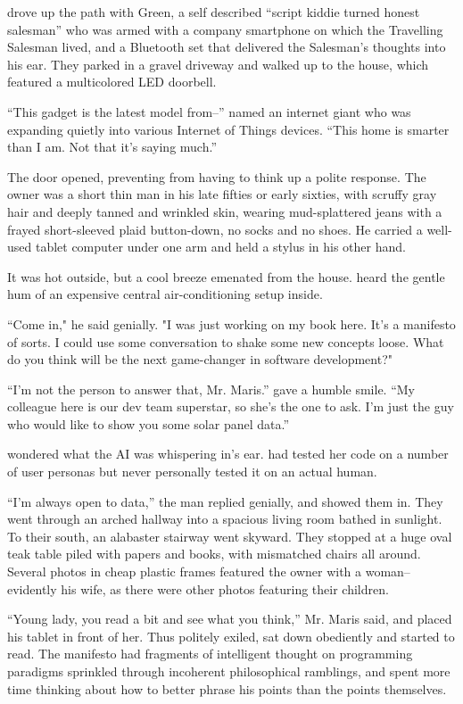 {\protag} drove up the path with \energyJerk{} Green, a self described ``script kiddie turned honest salesman'' who was armed with a company smartphone on which the Travelling Salesman lived, and a Bluetooth set that delivered the Salesman's thoughts into his ear. They parked in a gravel driveway and walked up to the house, which featured a multicolored LED doorbell.

``This gadget is the latest model from--'' \energyJerk{} named an internet giant who was expanding quietly into various Internet of Things devices. ``This home is smarter than I am. Not that it's saying much.''

The door opened, preventing {\protag} from having to think up a polite response. The owner was a short thin man in his late fifties or early sixties, with scruffy gray hair and deeply tanned and wrinkled skin, wearing mud-splattered jeans with a frayed short-sleeved plaid button-down, no socks and no shoes. He carried a well-used tablet computer under one arm and held a stylus in his other hand.

It was hot outside, but a cool breeze emenated from the house. {\protag} heard the gentle hum of an expensive central air-conditioning setup inside.

``Come in," he said genially. "I was just working on my book here. It's a manifesto of sorts. I could use some conversation to shake some new concepts loose. What do you think will be the next game-changer in software development?"

``I'm not the person to answer that, Mr. Maris.'' \energyJerk{} gave a humble smile. ``My colleague here is our dev team superstar, so she's the one to ask. I'm just the guy who would like to show you some solar panel data.''

{\protag} wondered what the AI was whispering in\energyJerk{}'s ear. {\protag} had tested her code on a number of user personas but never personally tested it on an actual human.

``I'm always open to data,'' the man replied genially, and showed them in. They went through an arched hallway into a spacious living room bathed in sunlight. To their south, an alabaster stairway went skyward. They stopped at a huge oval teak table piled with papers and books, with mismatched chairs all around. Several photos in cheap plastic frames featured the owner with a woman--evidently his wife, as there were other photos featuring their children.

``Young lady, you read a bit and see what you think,'' Mr. Maris said, and placed his tablet in front of her. Thus politely exiled, {\protag} sat down obediently and started to read. The manifesto had fragments of intelligent thought on programming paradigms sprinkled through incoherent philosophical ramblings, and {\protag} spent more time thinking about how to better phrase his points than the points themselves.

